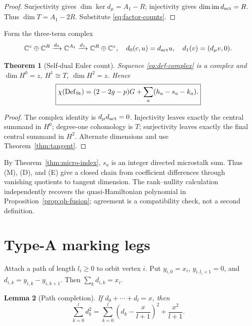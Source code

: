 \documentclass[11pt,a4paper]{amsart}
\theoremstyle{plain}
\newtheorem{theorem}{Theorem}[section]
\newtheorem{lemma}[theorem]{Lemma}
\theoremstyle{definition}
\newcommand{\CC}{\mathbb C}
\newcommand{\im}{\operatorname{im}}
\newcommand{\Def}{\operatorname{Def}}
\begin{document}
\begin{proof}
Surjectivity gives $\dim\ker d_\mu=A_1-R$; injectivity gives
$\dim\im d_{\rm act}=R$.  Thus $\dim T=A_1-2R$.  Substitute \eqref{eq:factor-counts}.
\end{proof}

Form the three-term complex
\begin{equation}\label{eq:def-complex}
 \CC^z\oplus\CC^R\xrightarrow{d_0}\CC^{A_1}
 \xrightarrow{d_1}\CC^R\oplus\CC^z,
 \quad d_0(c,u)=d_{\rm act}u,\quad d_1(v)=(d_\mu v,0).
\end{equation}

\begin{theorem}[Self-dual Euler count]\label{thm:euler-count}
Sequence \eqref{eq:def-complex} is a complex and
$\dim H^0=z$, $H^1\cong T$, $\dim H^2=z$.  Hence
\begin{equation}\label{eq:euler-count}
 \boxed{\chi(\Def_{\rm St})=(2-2g-p)G+\sum_a(h_a-s_a-k_a).}
\end{equation}
\end{theorem}

\begin{proof}
The complex identity is $d_\mu d_{\rm act}=0$.  Injectivity leaves exactly the central summand in
$H^0$; degree-one cohomology is $T$; surjectivity leaves exactly the final central summand in
$H^2$.  Alternate dimensions and use Theorem~\ref{thm:tangent}.
\end{proof}

By Theorem~\ref{thm:micro-index}, $s_a$ is an integer directed microstalk sum.  Thus (M), (D), and
(E) give a closed chain from coefficient differences through vanishing quotients to tangent
dimension.  The rank--nullity calculation independently recovers the quasi-Hamiltonian polynomial
in Proposition~\ref{prop:qh-fusion}; agreement is a compatibility check, not a second definition.

\section{Type-A marking legs}\label{sec:legs}

Attach a path of length $l_i\geq0$ to orbit vertex $i$.  Put $y_{i,0}=x_i$,
$y_{i,l_i+1}=0$, and $d_{i,k}=y_{i,k}-y_{i,k+1}$.  Then $\sum_kd_{i,k}=x_i$.

\begin{lemma}[Path completion]\label{lem:path}
If $d_0+\cdots+d_l=x$, then
\begin{equation}\label{eq:path}
 \sum_{k=0}^{l}d_k^2=
 \sum_{k=0}^{l}\left(d_k-\frac{x}{l+1}\right)^2+\frac{x^2}{l+1}.
\end{equation}
\end{lemma}
\end{document}
